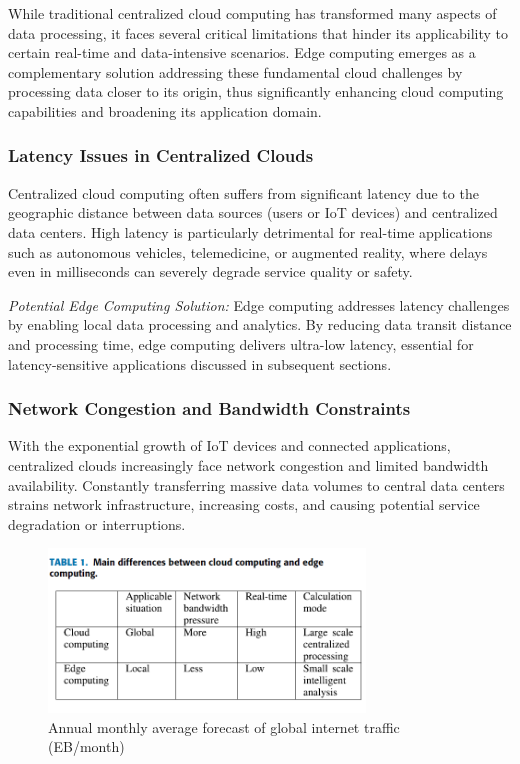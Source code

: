 \documentclass[runningheads]{llncs}
\begin{document}
While traditional centralized cloud computing has transformed many aspects of data processing, it faces several critical limitations that hinder its applicability to certain real-time and data-intensive scenarios. Edge computing emerges as a complementary solution addressing these fundamental cloud challenges by processing data closer to its origin, thus significantly enhancing cloud computing capabilities and broadening its application domain.

\subsubsection{Latency Issues in Centralized Clouds}
Centralized cloud computing often suffers from significant latency due to the geographic distance between data sources (users or IoT devices) and centralized data centers. High latency is particularly detrimental for real-time applications such as autonomous vehicles, telemedicine, or augmented reality, where delays even in milliseconds can severely degrade service quality or safety.

\textit{Potential Edge Computing Solution:} Edge computing addresses latency challenges by enabling local data processing and analytics. By reducing data transit distance and processing time, edge computing delivers ultra-low latency, essential for latency-sensitive applications discussed in subsequent sections.

\subsubsection{Network Congestion and Bandwidth Constraints}
With the exponential growth of IoT devices and connected applications, centralized clouds increasingly face network congestion and limited bandwidth availability. Constantly transferring massive data volumes to central data centers strains network infrastructure, increasing costs, and causing potential service degradation or interruptions.

\begin{figure}[ht]
    \centering
    \includegraphics[width=0.75\textwidth]{IMG/5.png}
    \caption{Annual monthly average forecast of global internet traffic (EB/month)}
    \label{fig:internet_traffic}
    \end{figure}
\end{document}
